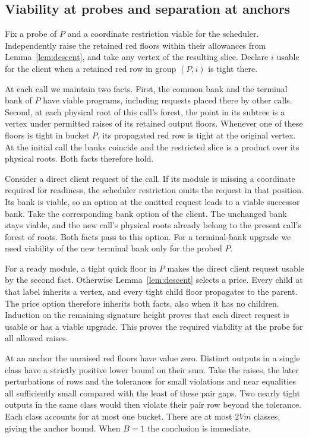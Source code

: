 \subsection{Viability at probes and separation at anchors}

Fix a probe of \(P\) and a coordinate restriction viable for the scheduler.
Independently raise the retained red floors within their allowances from
Lemma~\ref{lem:descent}, and take any vertex of the resulting slice. Declare \(i\)
usable for the client when a retained red row in group \((P,i)\) is tight there.

At each call we maintain two facts. First, the common bank and the terminal bank
of \(P\) have viable programs, including requests placed there by other calls.
Second, at each physical root of this call's forest, the point in its subtree is
a vertex under permitted raises of its retained output floors. Whenever one of
these floors is tight in bucket \(P\), its propagated red row is tight at the
original vertex. At the initial call the banks coincide and the restricted slice
is a product over its physical roots. Both facts therefore hold.

Consider a direct client request of the call. If its module is missing a coordinate
required for readiness, the scheduler restriction omits the request in that position.
Its bank is viable, so an option at the omitted request leads to a viable successor
bank. Take the corresponding bank option of the client. The unchanged bank stays
viable, and the new call's physical roots already belong to the present call's
forest of roots. Both facts pass to this option. For a terminal-bank upgrade we need
viability of the new terminal bank only for the probed \(P\).

For a ready module, a tight quick floor in \(P\) makes the direct client request
usable by the second fact. Otherwise Lemma~\ref{lem:descent} selects a price.
Every child at that label inherits a vertex, and every tight child floor propagates
to the parent. The price option therefore inherits both facts, also when it has no
children. Induction on the remaining signature height proves that each direct
request is usable or has a viable upgrade. This proves the required viability
at the probe for all allowed raises.

At an anchor the unraised red floors have value zero. Distinct outputs in a single
class have a strictly positive lower bound on their sum. Take the raises, the later
perturbations of rows and the tolerances for small violations and near equalities
all sufficiently small compared with the least of these pair gaps. Two nearly
tight outputs in the same class would then violate their pair row beyond the
tolerance. Each class accounts for at most one bucket. There are at most \(2Vm\)
classes, giving the anchor bound. When \(B=1\) the conclusion is immediate.

